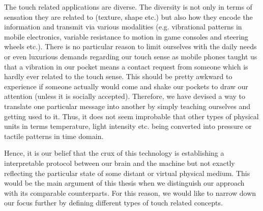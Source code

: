 The touch related applications are diverse. The diversity is not only in terms of sensation they are related to (texture, shape etc.) but also how they encode the information and transmit via various modalities (e.g. vibrational patterns in mobile electronics, variable resistance to motion in game consoles and steering wheels etc.). There is no particular reason to limit ourselves with the daily needs or even luxurious demands regarding our touch sense as mobile phones taught us that a vibration in our pocket means a contact request from someone which is hardly ever related to the touch sense. This should be pretty awkward to experience if someone actually would come and shake our pockets to draw our attention (unless it is socially accepted). Therefore, we have devised a way to translate one particular message into another by simply teaching ourselves and getting used to it. Thus, it does not seem improbable that other types of physical units in terms temperature, light intensity etc. being converted into pressure or tactile patterns in time domain.

Hence, it is our belief that the crux of this technology is establishing a interpretable protocol between our brain and the machine but not exactly reflecting the particular state of some distant or virtual physical medium. 
This would be the main argument of this thesis when we distinguish our approach with its comparable counterparts. For this reason, we would like to narrow down our focus further by defining different types of touch related concepts.






